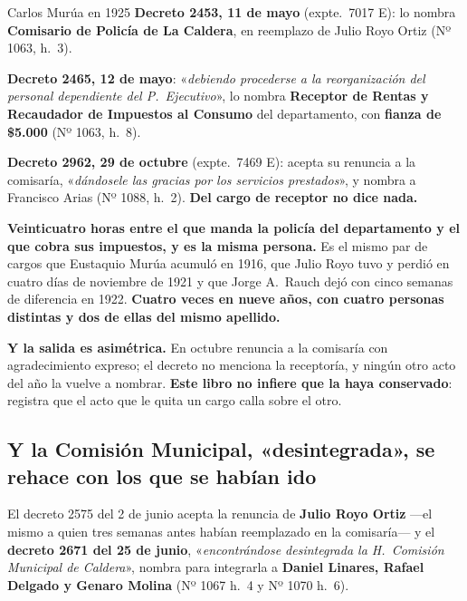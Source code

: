 \begin{ficha}{Carlos Murúa en 1925}
\textbf{Decreto 2453, 11 de mayo} (expte.\ 7017 E): lo nombra \textbf{Comisario de Policía de La
Caldera}, en reemplazo de Julio Royo Ortiz (Nº 1063, h.\ 3).

\textbf{Decreto 2465, 12 de mayo}: «\textit{debiendo procederse a la reorganización del personal
dependiente del P.\ Ejecutivo}», lo nombra \textbf{Receptor de Rentas y Recaudador de Impuestos
al Consumo} del departamento, con \textbf{fianza de \$5.000} (Nº 1063, h.\ 8).

\textbf{Decreto 2962, 29 de octubre} (expte.\ 7469 E): acepta su renuncia a la comisaría,
«\textit{dándosele las gracias por los servicios prestados}», y nombra a Francisco Arias
(Nº 1088, h.\ 2). \textbf{Del cargo de receptor no dice nada.}
\end{ficha}

\begin{cautela}
\textbf{Veinticuatro horas entre el que manda la policía del departamento y el que cobra sus
impuestos, y es la misma persona.} Es el mismo par de cargos que Eustaquio Murúa
acumuló en 1916, que Julio Royo tuvo y perdió en cuatro días de noviembre de 1921 y que Jorge A.\ Rauch dejó con cinco semanas de diferencia en 1922. \textbf{Cuatro
veces en nueve años, con cuatro personas distintas y dos de ellas del mismo apellido.}

\textbf{Y la salida es asimétrica.} En octubre renuncia a la comisaría con agradecimiento
expreso; el decreto no menciona la receptoría, y ningún otro acto del año la vuelve a nombrar.
\textbf{Este libro no infiere que la haya conservado}: registra que el acto que le quita un cargo
calla sobre el otro.
\end{cautela}

\subsection*{Y la Comisión Municipal, «desintegrada», se rehace con los que se habían ido}

El decreto 2575 del 2 de junio acepta la renuncia de \textbf{Julio Royo Ortiz} ---el mismo a quien
tres semanas antes habían reemplazado en la comisaría--- y el \textbf{decreto 2671 del 25 de
junio}, «\textit{encontrándose desintegrada la H.\ Comisión Municipal de Caldera}», nombra para
integrarla a \textbf{Daniel Linares, Rafael Delgado y Genaro Molina}
(Nº 1067 h.\ 4 y Nº 1070 h.\ 6).

